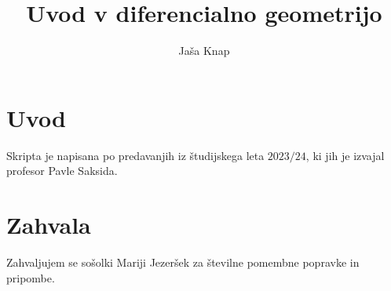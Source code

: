 \documentclass[10pt, a4paper]{article}
\begin{document}
\title{Uvod v diferencialno geometrijo}
\author{Jaša Knap}
\maketitle

\section*{Uvod}
Skripta je napisana po predavanjih iz študijskega leta $2023/24$, ki jih je izvajal profesor Pavle Saksida. 

\section*{Zahvala}
Zahvaljujem se sošolki Mariji Jezeršek za številne pomembne popravke in pripombe.





\end{document}
